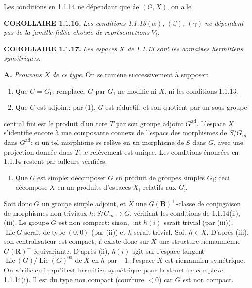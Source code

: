 \documentclass[10pt,a4paper]{article}
\providecommand{\tightlist}{\setlength{\itemsep}{0pt}\setlength{\parskip}{0pt}}
\newcommand{\SourcePage}[2]{\clearpage\setcounter{page}{#2}\typeout{D031_SOURCE_PAGE physical=#1 printed=#2}}
\begin{document}
Les conditions en 1.1.14 ne dépendant que de \((G,X)\), on a le

\textbf{COROLLAIRE 1.1.16.} \emph{Les conditions 1.1.13\((\alpha)\), \((\beta)\), \((\gamma)\) ne dépendent pas de la famille fidèle choisie de représentations \(V_i\).}

\textbf{COROLLAIRE 1.1.17.} \emph{Les espaces \(X\) de 1.1.13 sont les domaines hermitiens symétriques.}

\textbf{A.} \emph{Prouvons \(X\) de ce type.} On se ramène successivement à supposer:

\begin{enumerate}
\def\labelenumi{(\arabic{enumi})}
\item
  Que \(G=G_1\): remplacer \(G\) par \(G_1\) ne modifie ni \(X\), ni les conditions 1.1.13.
\item
  Que \(G\) est adjoint: par (1), \(G\) est réductif, et son quotient par un sous-groupe
\end{enumerate}

\SourcePage{10}{256}
central fini est le produit d'un tore \(T\) par son groupe adjoint \(G^{\mathrm{ad}}\). L'espace \(X\) s'identifie encore à une composante connexe de l'espace des morphismes de \(S/G_m\) dans \(G^{\mathrm{ad}}\): si un tel morphisme se relève en un morphisme de \(S\) dans \(G\), avec une projection donnée dans \(T\), le relèvement est unique. Les conditions énoncées en 1.1.14 restent par ailleurs vérifiées.

\begin{enumerate}
\def\labelenumi{(\arabic{enumi})}
\setcounter{enumi}{2}
\tightlist
\item
  Que \(G\) est simple: décomposer \(G\) en produit de groupes simples \(G_i\); ceci décompose \(X\) en un produits d'espaces \(X_i\) relatifs aux \(G_i\).
\end{enumerate}

Soit donc \(G\) un groupe simple adjoint, et \(X\) une \(G(\mathbf R)^+\)-classe de conjugaison de morphismes non triviaux \(h:S/G_m\to G\), vérifiant les conditions de 1.1.14(ii), (iii). Le groupe \(G\) est non compact: sinon, \(\operatorname{int}h(i)\) serait trivial (par (iii)), \(\operatorname{Lie}G\) serait de type \((0,0)\) (par (ii)) et \(h\) serait trivial. Soit \(h\in X\). D'après (iii), son centralisateur est compact; il existe donc sur \(X\) une structure riemannienne \(G(\mathbf R)^+\)-équivariante. D'après (ii), \(h(i)\) agit sur l'espace tangent \(\operatorname{Lie}(G)/\operatorname{Lie}(G)^{00}\) de \(X\) en \(h\) par \(-1\): l'espace \(X\) est riemannien symétrique. On vérifie enfin qu'il est hermitien symétrique pour la structure complexe 1.1.14(i). Il est du type non compact (courbure \(<0\)) car \(G\) est non compact.
\end{document}
